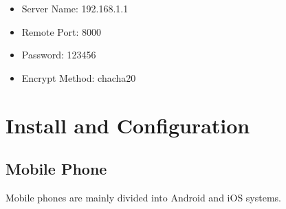 \documentclass[12pt]{wx672article}
\begin{document}
\label{org78958ea}
\begin{itemize}
\item Server Name: 192.168.1.1

\item Remote Port: 8000

\item Password: 123456

\item Encrypt Method: chacha20
\end{itemize}


\section*{Install and Configuration}
\label{sec:org745cbb5}

\subsection*{Mobile Phone}
\label{sec:orga3c3207}
Mobile phones are mainly divided into Android and iOS systems.
\end{document}
